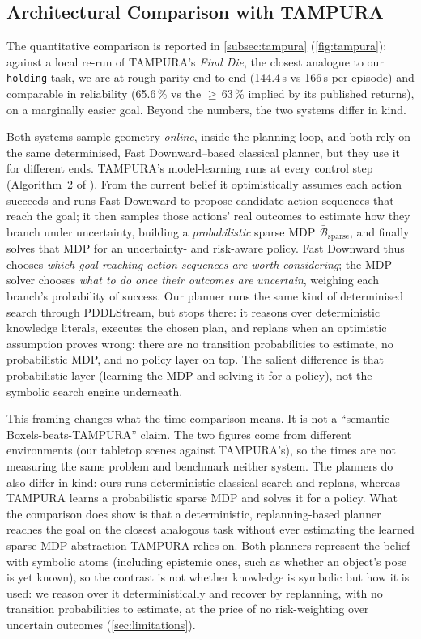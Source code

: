 \subsection{Architectural Comparison with TAMPURA}
\label{sec:disc-tampura}

The quantitative comparison is reported in \cref{subsec:tampura}
(\cref{fig:tampura}): against a local re-run of TAMPURA's \emph{Find Die},
the closest analogue to our \texttt{holding} task, we are at rough
parity end-to-end (144.4\,s vs 166\,s per episode) and comparable in
reliability (65.6\,\% vs the $\geq$\,63\,\% implied by its published
returns), on a marginally easier goal.
Beyond the numbers, the two systems differ in kind.

Both systems sample geometry \emph{online}, inside the planning loop, and
both rely on the same determinised, Fast Downward--based classical planner,
but they use it for different ends. TAMPURA's model-learning runs at
every control step (Algorithm~2 of \cite{curtis2024partially}). From the
current belief it optimistically assumes each action succeeds and runs
Fast Downward to propose candidate action sequences that reach the goal;
it then samples those actions' real outcomes to estimate how they branch
under uncertainty, building a \emph{probabilistic} sparse MDP
$\bar{\mathcal{B}}_\text{sparse}$, and finally solves that MDP
for an uncertainty- and risk-aware policy. Fast Downward thus chooses
\emph{which goal-reaching action sequences are worth considering}; the MDP
solver chooses \emph{what to do once their outcomes are uncertain}, weighing
each branch's probability of success. Our planner runs the same kind of
determinised search through PDDLStream, but stops there: it reasons over
deterministic knowledge literals, executes the chosen plan, and replans
when an optimistic assumption proves wrong: there are no transition
probabilities to estimate, no probabilistic MDP, and no policy layer on
top. The salient difference is that probabilistic layer (learning the
MDP and solving it for a policy), not the symbolic search
engine underneath.

This framing changes what the time comparison means. It is
not a ``semantic-Boxels-beats-TAMPURA'' claim. The two figures come from
different environments (our tabletop scenes against TAMPURA's), so the
times are not measuring the same problem and benchmark neither
system. The planners do also differ in kind: ours runs deterministic
classical search and replans, whereas TAMPURA learns a probabilistic
sparse MDP and solves it for a policy. What the comparison does show is
that a deterministic, replanning-based planner reaches the goal on the
closest analogous task without ever estimating the learned sparse-MDP
abstraction TAMPURA relies on. Both planners represent the belief with
symbolic atoms (including epistemic ones, such as whether an object's
pose is yet known), so the contrast is not whether knowledge is symbolic
but how it is used: we reason over it deterministically and recover by
replanning, with no transition probabilities to estimate, at the price of
no risk-weighting over uncertain outcomes (\cref{sec:limitations}).

